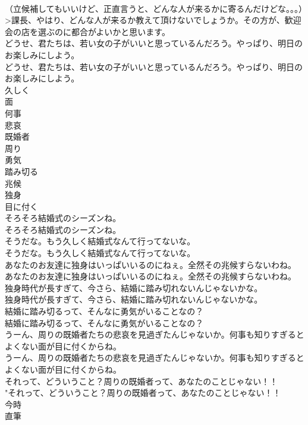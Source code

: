 \documentclass[8pt]{extreport}
\begin{document}
\begin{CJK}{UTF8}{min}
\\	（立候補してもいいけど、正直言うと、どんな人が来るかに寄るんだけどな。。。）>課長、やはり、どんな人が来るか教えて頂けないでしょうか。その方が、歓迎会の店を選ぶのに都合がよいかと思います。 
\\	どうせ、君たちは、若い女の子がいいと思っているんだろう。やっぱり、明日のお楽しみにしよう。	
\\	どうせ、君たちは、若い女の子がいいと思っているんだろう。やっぱり、明日のお楽しみにしよう。 
\\	久しく
\\	面
\\	何事
\\	悲哀
\\	既婚者
\\	周り
\\	勇気
\\	踏み切る
\\	兆候
\\	独身
\\	目に付く
\\	そろそろ結婚式のシーズンね。	
\\	そろそろ結婚式のシーズンね。 
\\	そうだな。もう久しく結婚式なんて行ってないな。	
\\	そうだな。もう久しく結婚式なんて行ってないな。 
\\	あなたのお友達に独身はいっぱいいるのにねぇ。全然その兆候すらないわね。	
\\	あなたのお友達に独身はいっぱいいるのにねぇ。全然その兆候すらないわね。 
\\	独身時代が長すぎて、今さら、結婚に踏み切れないんじゃないかな。	
\\	独身時代が長すぎて、今さら、結婚に踏み切れないんじゃないかな。 
\\	結婚に踏み切るって、そんなに勇気がいることなの？	
\\	結婚に踏み切るって、そんなに勇気がいることなの？ 
\\	うーん、周りの既婚者たちの悲哀を見過ぎたんじゃないか。何事も知りすぎるとよくない面が目に付くからね。	
\\	うーん、周りの既婚者たちの悲哀を見過ぎたんじゃないか。何事も知りすぎるとよくない面が目に付くからね。 
\\	それって、どういうこと？周りの既婚者って、あなたのことじゃない！！	
\\	"それって、どういうこと？周りの既婚者って、あなたのことじゃない！！ 
\\	今時
\\	直筆

\end{CJK}
\end{document}
